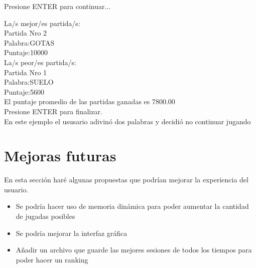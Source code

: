\documentclass[oneside]{article}
\begin{document}
	Presione ENTER para continuar...

	\newpage
	\thispagestyle{fancy}
	
	La/s mejor/es partida/s:\\
	Partida Nro 2\\
	Palabra:GOTAS\\
	Puntaje:10000\\

	La/s peor/es partida/s:\\
	Partida Nro 1\\
	Palabra:SUELO\\
	Puntaje:5600\\

	El puntaje promedio de las partidas ganadas es 7800.00\\
	Presione ENTER para finalizar.\\
	
	En este ejemplo el ususario adivinó dos palabras y decidió no continuar jugando
	
	\newpage
	\thispagestyle{fancy}
	
	\section*{Mejoras futuras}
	En esta sección haré algunas propuestas que podrían mejorar la experiencia del usuario.
	\begin{itemize}
	\item Se podría hacer uso de memoria dinámica para poder aumentar la cantidad de jugadas posibles
	\item Se podría mejorar la interfaz gráfica
	\item Añadir un archivo que guarde las mejores sesiones de todos los tiempos para poder hacer un ranking
	\end{itemize}
	
	\newpage
	\thispagestyle{fancy}
	
\end{document}
